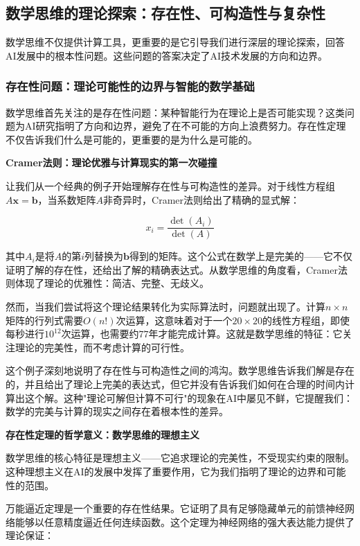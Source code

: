 \subsection{数学思维的理论探索：存在性、可构造性与复杂性}

数学思维不仅提供计算工具，更重要的是它引导我们进行深层的理论探索，回答AI发展中的根本性问题。这些问题的答案决定了AI技术发展的方向和边界。

\subsubsection{存在性问题：理论可能性的边界与智能的数学基础}

数学思维首先关注的是存在性问题：某种智能行为在理论上是否可能实现？这类问题为AI研究指明了方向和边界，避免了在不可能的方向上浪费努力。存在性定理不仅告诉我们什么是可能的，更重要的是为什么是可能的。

\textbf{Cramer法则：理论优雅与计算现实的第一次碰撞}

让我们从一个经典的例子开始理解存在性与可构造性的差异。对于线性方程组$A\mathbf{x} = \mathbf{b}$，当系数矩阵$A$非奇异时，Cramer法则给出了精确的显式解：

$$x_i = \frac{\det(A_i)}{\det(A)}$$

其中$A_i$是将$A$的第$i$列替换为$\mathbf{b}$得到的矩阵。这个公式在数学上是完美的——它不仅证明了解的存在性，还给出了解的精确表达式。从数学思维的角度看，Cramer法则体现了理论的优雅性：简洁、完整、无歧义。

然而，当我们尝试将这个理论结果转化为实际算法时，问题就出现了。计算$n \times n$矩阵的行列式需要$O(n!)$次运算，这意味着对于一个$20 \times 20$的线性方程组，即使每秒进行$10^{12}$次运算，也需要约$77$年才能完成计算。这就是数学思维的特征：它关注理论的完美性，而不考虑计算的可行性。

这个例子深刻地说明了存在性与可构造性之间的鸿沟。数学思维告诉我们解是存在的，并且给出了理论上完美的表达式，但它并没有告诉我们如何在合理的时间内计算出这个解。这种"理论可解但计算不可行"的现象在AI中屡见不鲜，它提醒我们：数学的完美与计算的现实之间存在着根本性的差异。

\textbf{存在性定理的哲学意义：数学思维的理想主义}

数学思维的核心特征是理想主义——它追求理论的完美性，不受现实约束的限制。这种理想主义在AI的发展中发挥了重要作用，它为我们指明了理论的边界和可能性的范围。

万能逼近定理是一个重要的存在性结果。它证明了具有足够隐藏单元的前馈神经网络能够以任意精度逼近任何连续函数。这个定理为神经网络的强大表达能力提供了理论保证：

